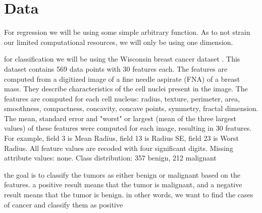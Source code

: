 \documentclass[twoside,11pt]{report}
\begin{document}
\section{Data}
\label{sec:data}

For regression we will be using some simple arbitrary function. As to not strain our limited computational resources,
we will only be using one dimension. 

for classification we will be using the Wisconsin breast cancer dataset \cite{wdbc}. This dataset contains 569 data points
with 30 features each. The features are computed from a digitized image of a fine needle aspirate (FNA) of a breast mass.
They describe characteristics of the cell nuclei present in the image. The features are computed for each cell nucleus:
radius, texture, perimeter, area, smoothness, compactness, concavity, concave points, symmetry, fractal dimension.
The mean, standard error and "worst" or largest (mean of the three largest values) of these features were computed for each image,
resulting in 30 features. For example, field 3 is Mean Radius, field 13 is Radius SE, field 23 is Worst Radius.
All feature values are recoded with four significant digits. Missing attribute values: none.
Class distribution: 357 benign, 212 malignant

the goal is to classify the tumors as either benign or malignant based on the features.
a positive result means that the tumor is malignant, and a negative result means that the tumor is benign.
in other words, we want to find the cases of cancer and classify them as positive
\end{document}
